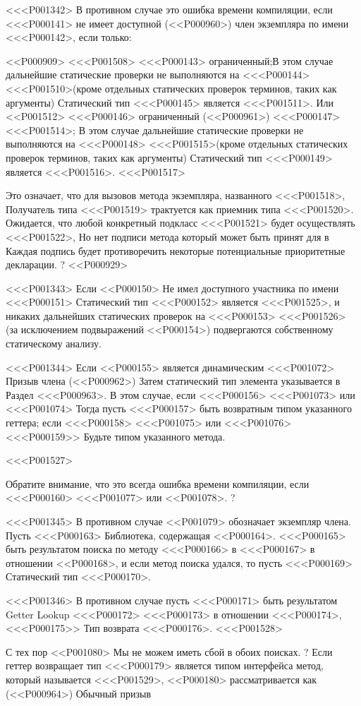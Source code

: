 {{{{{{{{{{{<<<P001342>%
В противном случае это ошибка времени компиляции, если <<<P000141> не имеет доступной
(<<P000960>)
член экземпляра по имени <<<P000142>, если только:

<<P000909>
<<<P001508>
<<<P000143> \DYNAMIC{} ограниченный;В этом случае дальнейшие статические проверки не выполняются на <<<P000144>
<<<P001510>{(кроме отдельных статических проверок терминов, таких как аргументы)}
Статический тип <<<P000145> является <<<P001511>.
Или
<<P001512>
<<<P000146> \FUNCTION{} ограниченный
(<<P000961>)
<<<P000147> <<<P001514>;
В этом случае дальнейшие статические проверки не выполняются на <<<P000148>
<<<P001515>{(кроме отдельных статических проверок терминов, таких как аргументы)}
Статический тип <<<P000149> является <<<P001516>.
<<<P001517>{%
Это означает, что для вызовов метода экземпляра, названного <<<P001518>,
Получатель типа <<<P001519>{} трактуется как приемник типа <<<P001520>.
Ожидается, что любой конкретный подкласс <<<P001521>
будет осуществлять <<<P001522>,
Но нет подписи метода
который может быть принят для \CALL{} в \FUNCTION{}
Каждая подпись будет противоречить
некоторые потенциальные приоритетные декларации.%
?
<<P000929>

<<<P001343>%
Если <<P000150> Не имел доступного участника по имени <<<P000151>
Статический тип <<<P000152> является <<<P001525>,
и никаких дальнейших статических проверок на <<<P000153>
<<<P001526>{%
(за исключением подвыражений <<P000154>) подвергаются собственному статическому анализу.
}

<<<P001344>%
Если <<P000155> является динамическим <<<P001072> Призыв члена
(<<P000962>)
Затем статический тип элемента указывается в
Раздел <<<P000963>.
В этом случае, если <<<P000156> <<<P001073> или <<<P001074>
Тогда пусть <<<P000157> быть возвратным типом указанного геттера;
если <<<P000158> <<<P001075> или <<<P001076>
<<<P000159>> Будьте типом указанного метода.

<<<P001527>{%
Обратите внимание, что это всегда ошибка времени компиляции, если <<<P000160>
<<<P001077> или <<P001078>.
?

<<<P001345>%
В противном случае <<P001079> обозначает экземпляр члена.
Пусть <<<P000163> Библиотека, содержащая <<P000164>.
<<<P000165> быть результатом поиска по методу <<<P000166> в <<<P000167> в отношении <<P000168>,
и если метод поиска удался, то пусть <<<P000169> Статический тип <<<P000170>.

<<<P001346>%
В противном случае пусть <<<P000171> быть результатом Getter Lookup
<<<P000172> <<<P000173> в отношении <<<P000174>,
<<<P000175>> Тип возврата <<<P000176>.
<<<P001528>{%
С тех пор <<P001080> Мы не можем иметь сбой в обоих поисках.%
?
Если геттер возвращает тип <<<P000179> является типом интерфейса
метод, который называется <<<P001529>,
<<P000180> рассматривается как
(<<P000964>)
Обычный призыв

}}}}}}}}}}}}}}
